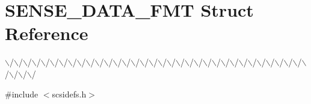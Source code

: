 \hypertarget{structSENSE__DATA__FMT}{\section{S\-E\-N\-S\-E\-\_\-\-D\-A\-T\-A\-\_\-\-F\-M\-T Struct Reference}
\label{structSENSE__DATA__FMT}
}


$\backslash$/$\backslash$/$\backslash$/$\backslash$/$\backslash$/$\backslash$/$\backslash$/$\backslash$/$\backslash$/$\backslash$/$\backslash$/$\backslash$/$\backslash$/$\backslash$/$\backslash$/$\backslash$/$\backslash$/$\backslash$/$\backslash$/$\backslash$/$\backslash$/$\backslash$/$\backslash$/$\backslash$/$\backslash$/$\backslash$/$\backslash$/$\backslash$/$\backslash$/$\backslash$/$\backslash$/$\backslash$/$\backslash$/$\backslash$/$\backslash$/$\backslash$/$\backslash$/  




{\ttfamily \#include $<$scsidefs.\-h$>$}

